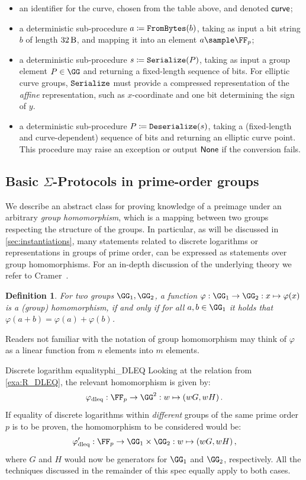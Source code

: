\documentclass[11pt]{article}
\newtheorem{definition}{Definition}
\begin{document}
\begin{itemize}
  \item an identifier for the curve, chosen from the table above, and denoted $\textsf{curve}$;
  \item a deterministic sub-procedure $a \coloneqq \texttt{FromBytes}(b)$, taking as input a bit string $b$ of length $\seedlen$, and mapping it into an element $a \sample \FF_p$;
  \item a deterministic sub-procedure $s \coloneqq \texttt{Serialize}(P)$, taking as input a group element $P \in \GG$ and returning a fixed-length sequence of bits.
  For elliptic curve groups, $\texttt{Serialize}$ must provide a compressed representation of the \emph{affine} representation, such as $x$-coordinate and one bit determining the sign of $y$.
  \item a deterministic sub-procedure $P \coloneqq \texttt{Deserialize}(s)$, taking a (fixed-length and curve-dependent) sequence of bits and returning an elliptic curve point. This procedure may raise an exception or output $\mathsf{None}$ if the conversion fails.
\end{itemize}

\subsection{Basic $\Sigma$-Protocols in prime-order groups}\label{sec:basic_sigma}
  We describe an abstract class for proving knowledge of a preimage under an arbitrary \emph{group homomorphism}, which is a mapping between two groups respecting the structure of the groups.
In particular, as will be discussed in \cref{sec:instantiations}, many statements related to discrete logarithms or representations in groups of prime order, can be expressed as statements over group homomorphisms.
For an in-depth discussion of the underlying theory we refer to Cramer~\cite{cramer97}.

\begin{definition}
  For two groups $\GG_1,\GG_2$, a function $\varphi:\GG_1\to\GG_2:x\mapsto\varphi(x)$ is a \emph{(group) homomorphism}, if and only if for all $a,b\in\GG_1$ it holds that $\varphi(a+b)=\varphi(a)+\varphi(b)$.
\end{definition}
Readers not familiar with the notation of group homomorphism may think of $\varphi$ as a linear function from $n$ elements into $m$ elements.

\begin{example}{Discrete logarithm equality}{phi_DLEQ}
  Looking at the relation from \cref{exa:R_DLEQ}, the relevant homomorphism is given by:
	$$
	  \varphi_{\operatorname{dleq}} : \FF_p\to\GG^2 : \witness\mapsto (\witness G,\witness H)\,.
	$$
	If equality of discrete logarithms within \emph{different} groups of the same prime order $p$ is to be proven, the homomorphism to be considered would be:
	$$
	  \varphi_{\operatorname{dleq}}' : \FF_p\to\GG_1\times\GG_2 : \witness\mapsto (\witness G,\witness H)\,,
	$$
	where $G$ and $H$ would now be generators for $\GG_1$ and $\GG_2$, respectively.
	All the techniques discussed in the remainder of this spec equally apply to both cases.
\end{example}
\end{document}
